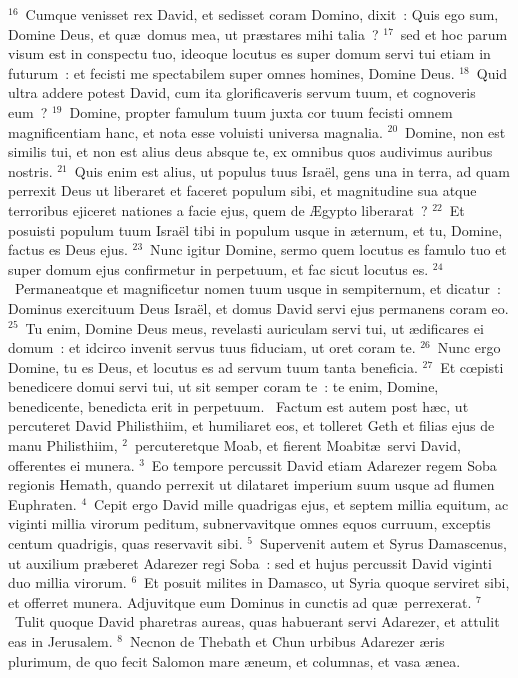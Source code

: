 ${}^{16}$~Cumque venisset rex David, et sedisset coram Domino, dixit~: Quis ego sum, Domine Deus, et qu\ae\ domus mea, ut pr\ae stares mihi talia~?
${}^{17}$~sed et hoc parum visum est in conspectu tuo, ideoque locutus es super domum servi tui etiam in futurum~: et fecisti me spectabilem super omnes homines, Domine Deus.
${}^{18}$~Quid ultra addere potest David, cum ita glorificaveris servum tuum, et cognoveris eum~?
${}^{19}$~Domine, propter famulum tuum juxta cor tuum fecisti omnem magnificentiam hanc, et nota esse voluisti universa magnalia.
${}^{20}$~Domine, non est similis tui, et non est alius deus absque te, ex omnibus quos audivimus auribus nostris.
${}^{21}$~Quis enim est alius, ut populus tuus Isra\"el, gens una in terra, ad quam perrexit Deus ut liberaret et faceret populum sibi, et magnitudine sua atque terroribus ejiceret nationes a facie ejus, quem de \AE gypto liberarat~?
${}^{22}$~Et posuisti populum tuum Isra\"el tibi in populum usque in \ae ternum, et tu, Domine, factus es Deus ejus.
${}^{23}$~Nunc igitur Domine, sermo quem locutus es famulo tuo et super domum ejus confirmetur in perpetuum, et fac sicut locutus es.
${}^{24}$~Permaneatque et magnificetur nomen tuum usque in sempiternum, et dicatur~: Dominus exercituum Deus Isra\"el, et domus David servi ejus permanens coram eo.
${}^{25}$~Tu enim, Domine Deus meus, revelasti auriculam servi tui, ut \ae dificares ei domum~: et idcirco invenit servus tuus fiduciam, ut oret coram te.
${}^{26}$~Nunc ergo Domine, tu es Deus, et locutus es ad servum tuum tanta beneficia.
${}^{27}$~Et cœpisti benedicere domui servi tui, ut sit semper coram te~: te enim, Domine, benedicente, benedicta erit in perpetuum.
~\lettrine[lines=10,image=true,loversize=0.05,lraise=-0.03]{F}{}actum est autem post h\ae c, ut percuteret David Philisthiim, et humiliaret eos, et tolleret Geth et filias ejus de manu Philisthiim,
${}^{2}$~percuteretque Moab, et fierent Moabit\ae\ servi David, offerentes ei munera.
${}^{3}$~Eo tempore percussit David etiam Adarezer regem Soba regionis Hemath, quando perrexit ut dilataret imperium suum usque ad flumen Euphraten.
${}^{4}$~Cepit ergo David mille quadrigas ejus, et septem millia equitum, ac viginti millia virorum peditum, subnervavitque omnes equos curruum, exceptis centum quadrigis, quas reservavit sibi.
${}^{5}$~Supervenit autem et Syrus Damascenus, ut auxilium pr\ae beret Adarezer regi Soba~: sed et hujus percussit David viginti duo millia virorum.
${}^{6}$~Et posuit milites in Damasco, ut Syria quoque serviret sibi, et offerret munera. Adjuvitque eum Dominus in cunctis ad qu\ae\ perrexerat.
${}^{7}$~Tulit quoque David pharetras aureas, quas habuerant servi Adarezer, et attulit eas in Jerusalem.
${}^{8}$~Necnon de Thebath et Chun urbibus Adarezer \ae ris plurimum, de quo fecit Salomon mare \ae neum, et columnas, et vasa \ae nea.


